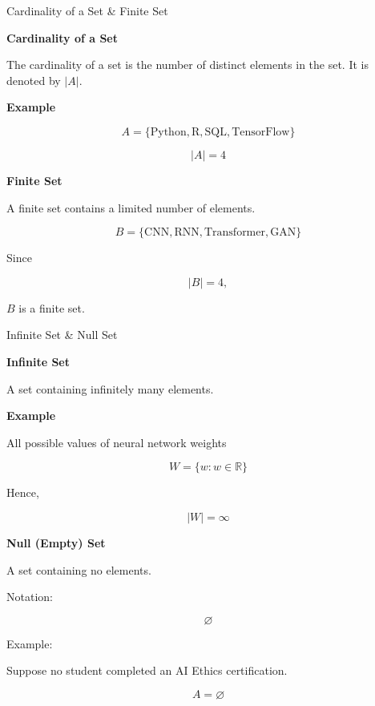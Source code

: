 \documentclass{beamer}
\begin{document}
\begin{frame}{Cardinality of a Set \& Finite Set}

\textbf{Cardinality of a Set}

The cardinality of a set is the number of distinct elements in the set.
It is denoted by $|A|$.

\textbf{Example }

\[
A=\{\text{Python},\text{R},\text{SQL},\text{TensorFlow}\}
\]

\[
|A|=4
\]

\vspace{0.2cm}

\textbf{Finite Set}

A finite set contains a limited number of elements.

\[
B=\{\text{CNN},\text{RNN},\text{Transformer},\text{GAN}\}
\]

Since

\[
|B|=4,
\]

$B$ is a finite set.

\end{frame}

\begin{frame}{Infinite Set \& Null Set}

\textbf{Infinite Set}

A set containing infinitely many elements.

\textbf{Example}

All possible values of neural network weights

\[
W=\{w:w\in\mathbb{R}\}
\]

Hence,

\[
|W|=\infty
\]

\vspace{0.3cm}

\textbf{Null (Empty) Set}

A set containing no elements.

Notation:

\[
\varnothing
\]

Example:

Suppose no student completed an AI Ethics certification.

\[
A=\varnothing
\]

\end{frame}
\end{document}

